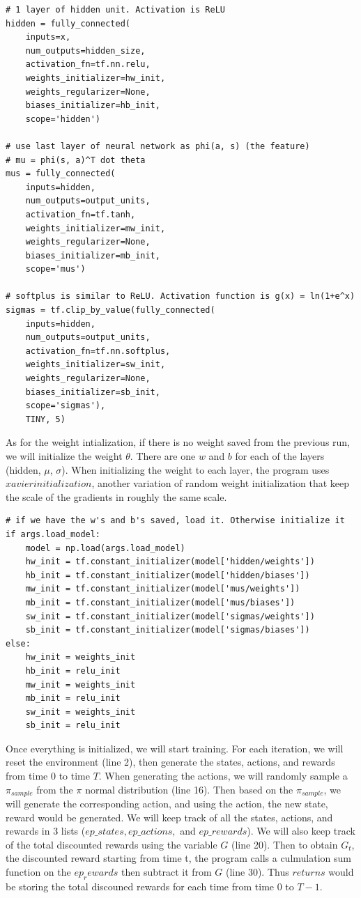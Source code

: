 \documentclass[11pt,twoside]{article}
\begin{document}
\begin{lstlisting}
# 1 layer of hidden unit. Activation is ReLU
hidden = fully_connected(
    inputs=x,
    num_outputs=hidden_size,
    activation_fn=tf.nn.relu,
    weights_initializer=hw_init,
    weights_regularizer=None,
    biases_initializer=hb_init,
    scope='hidden')

# use last layer of neural network as phi(a, s) (the feature)
# mu = phi(s, a)^T dot theta
mus = fully_connected(
    inputs=hidden,
    num_outputs=output_units,
    activation_fn=tf.tanh,
    weights_initializer=mw_init,
    weights_regularizer=None,
    biases_initializer=mb_init,
    scope='mus')

# softplus is similar to ReLU. Activation function is g(x) = ln(1+e^x)
sigmas = tf.clip_by_value(fully_connected(
    inputs=hidden,
    num_outputs=output_units,
    activation_fn=tf.nn.softplus,
    weights_initializer=sw_init,
    weights_regularizer=None,
    biases_initializer=sb_init,
    scope='sigmas'),
    TINY, 5)
\end{lstlisting}

As for the weight intialization, if there is no weight saved from the previous run, we will initialize the weight $\theta$. There are one $w$ and $b$ for each of the layers (hidden, $\mu$, $\sigma$). When initializing the weight to each layer, the program uses $xavier initialization$, another variation of random weight initialization that keep the scale of the gradients in roughly the same scale.

\begin{lstlisting}
# if we have the w's and b's saved, load it. Otherwise initialize it
if args.load_model:
    model = np.load(args.load_model)
    hw_init = tf.constant_initializer(model['hidden/weights'])
    hb_init = tf.constant_initializer(model['hidden/biases'])
    mw_init = tf.constant_initializer(model['mus/weights'])
    mb_init = tf.constant_initializer(model['mus/biases'])
    sw_init = tf.constant_initializer(model['sigmas/weights'])
    sb_init = tf.constant_initializer(model['sigmas/biases'])
else:
    hw_init = weights_init
    hb_init = relu_init
    mw_init = weights_init
    mb_init = relu_init
    sw_init = weights_init
    sb_init = relu_init
\end{lstlisting}

Once everything is initialized, we will start training. For each iteration, we will reset the environment (line 2), then generate the states, actions, and rewards from time 0 to time $T$. When generating the actions, we will randomly sample a $\pi_{sample}$ from the $\pi$ normal distribution (line 16). Then based on the $\pi_{sample}$, we will generate the corresponding action, and using the action, the new state, reward would be generated. We will keep track of all the states, actions, and rewards in 3 lists ($ep\_states, ep\_actions, $ and $ep\_rewards$). We will also keep track of the total discounted rewards using the variable $G$ (line 20). Then to obtain $G_t$, the discounted reward starting from time t, the program calls a culmulation sum function on the $ep_rewards$ then subtract it from $G$ (line 30). Thus $returns$ would be storing the total discouned rewards for each time from time 0 to $T-1$.
\end{document}
